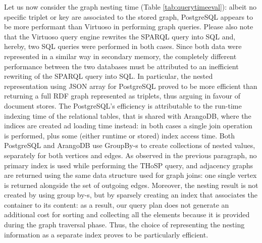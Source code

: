 Let us now consider the graph nesting time (Table \vref{tab:querytimeeval}): albeit no specific triplet or key are associated to the stored graph, PostgreSQL appears to be more performant than Virtuoso in performing graph queries. Please also note that the Virtuoso query engine rewrites the SPARQL query into SQL and, hereby, two SQL queries were performed in both cases. Since both data were represented in a similar way in secondary memory, the completely different performance between the two databases must be attributed  to an inefficient rewriting of the SPARQL query into SQL. In particular, the nested representation using JSON array for PostgreSQL proved to be more efficient than returning a full RDF graph represented as triplets, thus arguing in favour of document stores. The PostgreSQL's efficiency is attributable to the run-time indexing time of the relational tables, that is shared with ArangoDB, where the indices are created ad loading time instead: in both cases a single join operation is performed, plus some (either runtime or stored) index access time. Both PostgreSQL and ArangoDB use GroupBy-s to create collections of nested values, separately for both vertices and edges. As observed in the previous paragraph, no primary index is used while performing the THoSP query, and adjacency graphs are returned using the same data structure used for graph joins: one single vertex is returned alongside the set of outgoing edges. Moreover, the nesting result is not created by using group by-s, but by sparsely creating an index that associates the container to its content: as a result, our query plan does not generate an additional cost for sorting and collecting all the elements because it is provided during the graph traversal phase. Thus, the choice of representing the nesting information as a separate index proves to be particularly efficient.

